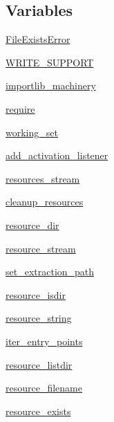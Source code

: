 \subsection*{Variables}
\begin{DoxyCompactItemize}
\item 
\hyperlink{namespacepkg__resources_a2ca0a416c35ea75d36921d810969e04e}{File\+Exists\+Error}
\item 
\hyperlink{namespacepkg__resources_a8cba25e3f73d53602d7f99bdba45d768}{W\+R\+I\+T\+E\+\_\+\+S\+U\+P\+P\+O\+RT}
\item 
\hyperlink{namespacepkg__resources_a66b38c27156e4bfec03efd41393cdbe1}{importlib\+\_\+machinery}
\item 
\hyperlink{namespacepkg__resources_a4b0ffc0687f16fe370416cea417a456f}{require}
\item 
\hyperlink{namespacepkg__resources_a5eecf7277dc4e63e653bfa39a805e4d2}{working\+\_\+set}
\item 
\hyperlink{namespacepkg__resources_a4a44c235f589f75c875c7f50d393214c}{add\+\_\+activation\+\_\+listener}
\item 
\hyperlink{namespacepkg__resources_aa5150f8a5dc0c8a25647e076b7ea642c}{resources\+\_\+stream}
\item 
\hyperlink{namespacepkg__resources_a095e28834fa3aa947015d2741c5582c0}{cleanup\+\_\+resources}
\item 
\hyperlink{namespacepkg__resources_aecfd8f199411bf803635a831918594bb}{resource\+\_\+dir}
\item 
\hyperlink{namespacepkg__resources_a118f064bfa3877be4193e9625ce77860}{resource\+\_\+stream}
\item 
\hyperlink{namespacepkg__resources_a2f0d36a78ded6f3d29365c541464f923}{set\+\_\+extraction\+\_\+path}
\item 
\hyperlink{namespacepkg__resources_a0580c0fcb1ada90918f5e9affeb2dc8f}{resource\+\_\+isdir}
\item 
\hyperlink{namespacepkg__resources_a929d3bc500116a3cacb30f0fb11c2f46}{resource\+\_\+string}
\item 
\hyperlink{namespacepkg__resources_a0003897e2044a6bedb14a89ad7cc5ce9}{iter\+\_\+entry\+\_\+points}
\item 
\hyperlink{namespacepkg__resources_a2d9efe1bc722649989e4fd568f646418}{resource\+\_\+listdir}
\item 
\hyperlink{namespacepkg__resources_a4d232c3e3dfb85fb17099b9d156df66f}{resource\+\_\+filename}
\item 
\hyperlink{namespacepkg__resources_a52c1ee536d5f0602a4dfbfb43a506fae}{resource\+\_\+exists}

\end{DoxyCompactItemize}
